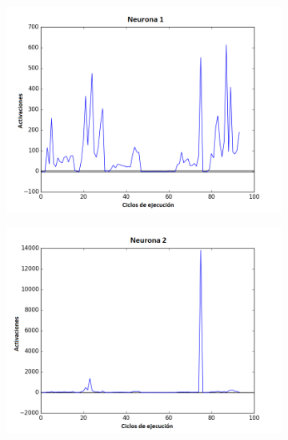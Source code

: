 \begin{figure}[!h]
    \centering %
\begin{subfigure}{0.33\textwidth}
  \includegraphics[width=\linewidth]{Imagenes/Agente2Activaciones/Agente3/Neurona0}
\end{subfigure}\hfil %
\begin{subfigure}{0.33\textwidth}
  \includegraphics[width=\linewidth]{Imagenes/Agente2Activaciones/Agente3/Neurona1}
\end{subfigure}\hfil %
\begin{subfigure}{0.33\textwidth}

\end{subfigure}
\end{figure}
